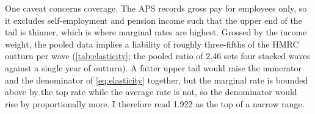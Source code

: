 One caveat concerns coverage. The APS records gross pay for employees only, so it excludes self-employment and pension income such that the upper end of the tail is thinner, which is where marginal rates are highest. Grossed by the income weight, the pooled data implies a liability of roughly three-fifths of the HMRC outturn per wave (\cref{tab:elasticity}; the pooled ratio of 2.46 sets four stacked waves against a single year of outturn). A fatter upper tail would raise the numerator and the denominator of \cref{eq:elasticity} together, but the marginal rate is bounded above by the top rate while the average rate is not, so the denominator would rise by proportionally more. I therefore read 1.922 as the top of a narrow range. 


\begin{table}[h]
\centering
\caption{Elasticity of Scottish NSND revenue to earnings}
\label{tab:elasticity}
\small

\end{table}